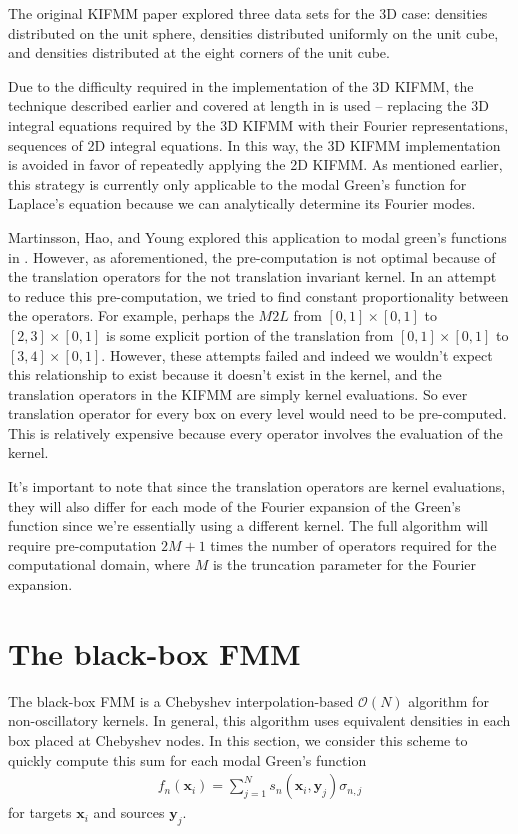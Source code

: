 \documentclass[11pt, oneside]{article}   	%
\begin{document}
The original KIFMM paper explored three data sets for the 3D case: densities distributed on the unit sphere, densities distributed uniformly on the unit cube, and densities distributed at the eight corners of the unit cube.

Due to the difficulty required in the implementation of the 3D KIFMM, the technique described earlier and covered at length in \cite{YYM} is used -- replacing the 3D integral equations required by the 3D KIFMM with their Fourier representations, sequences of 2D integral equations. In this way, the 3D KIFMM implementation is avoided in favor of repeatedly applying the 2D KIFMM. As mentioned earlier, this strategy is currently only applicable to the modal Green's function for Laplace's equation because we can analytically determine its Fourier modes.

Martinsson, Hao, and Young explored this application to modal green's functions in \cite{YYM}. However, as aforementioned, the pre-computation is not optimal because of the translation operators for the not translation invariant kernel. In an attempt to reduce this pre-computation, we tried to find constant proportionality between the operators. For example, perhaps the $M2L$ from $[0,1]\times[0,1]$ to $[2,3]\times[0,1]$ is some explicit portion of the translation from $[0,1]\times[0,1]$ to $[3,4]\times[0,1]$. However, these attempts failed and indeed we wouldn't expect this relationship to exist because it doesn't exist in the kernel, and the translation operators in the KIFMM are simply kernel evaluations. So ever translation operator for every box on every level would need to be pre-computed. This is relatively expensive because every operator involves the evaluation of the kernel.

It's important to note that since the translation operators are kernel evaluations, they will also differ for each mode of the Fourier expansion of the Green's function since we're essentially using a different kernel. The full algorithm will require pre-computation $2M+1$ times the number of operators required for the computational domain, where $M$ is the truncation parameter for the Fourier expansion.

\section{The black-box FMM}
The black-box FMM is a Chebyshev interpolation-based $\mathcal{O}(N)$ algorithm for non-oscillatory kernels. In general, this algorithm uses equivalent densities in each box placed at Chebyshev nodes. In this section, we consider this scheme to quickly compute this sum for each modal Green's function
\begin{align}
f_n(\mathbf{x}_i)=\sum_{j=1}^N s_n(\mathbf{x}_i,\mathbf{y}_j)\sigma_{n,j}
\end{align}
for targets $\mathbf{x}_i$ and sources $\mathbf{y}_j$.
\end{document}
